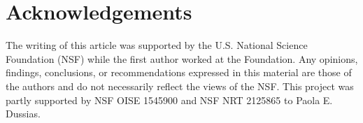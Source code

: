 \documentclass[output=paper,colorlinks,citecolor=brown]{langscibook}
\begin{document}


\section*{Acknowledgements}
The writing of this article was supported by the U.S. National Science Foundation (NSF) while the first author worked at the Foundation. Any opinions, findings, conclusions, or recommendations expressed in this material are those of the authors and do not necessarily reflect the views of the NSF. This project was partly supported by NSF OISE 1545900 and NSF NRT 2125865 to Paola E. Dussias.


\sloppy
\printbibliography[heading=subbibliography,notkeyword=this]
\end{document}
